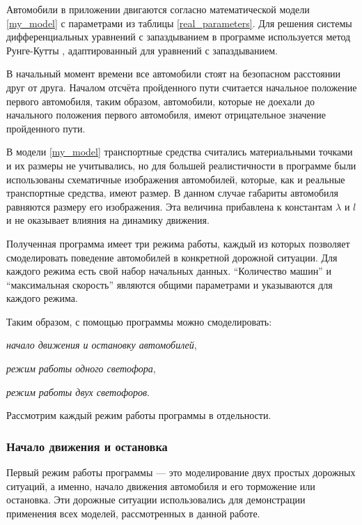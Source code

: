 \documentclass[12pt, a4paper]{extarticle}
\renewenvironment{itemize}[1][{---\hfil}]{\begin{list}{#1}{\topsep=0pt\parsep=0pt plus 1pt\itemsep=\parsep\leftmargin=0pt \itemindent=\parindent}\addtolength{\itemindent}{\labelwidth}}{\end{list}}
\numberwithin{equation}{section}
\numberwithin{figure}{section}
\begin{document}
Автомобили в приложении двигаются согласно математической модели \eqref{my_model} с параметрами из таблицы \ref{real_parameters}. Для решения системы дифференциальных уравнений с запаздыванием в программе используется метод Рунге-Кутты \cite{Runge_Kutta}, адаптированный для уравнений с запаздыванием.

В начальный момент времени все автомобили стоят на безопасном расстоянии друг от друга. Началом отсчёта пройденного пути считается начальное положение первого автомобиля, таким образом, автомобили, которые не доехали до начального положения первого автомобиля, имеют отрицательное значение пройденного пути.

В модели \eqref{my_model} транспортные средства считались материальными точками и их размеры не учитывались, но для большей реалистичности в программе были использованы схематичные изображения автомобилей, которые, как и реальные транспортные средства, имеют размер. В данном случае габариты автомобиля равняются размеру его изображения. Эта величина прибавлена к константам $\lambda$ и $l$ и не оказывает влияния на динамику движения.

Полученная программа имеет три режима работы, каждый из которых позволяет смоделировать поведение автомобилей в конкретной дорожной ситуации. Для каждого режима есть свой набор начальных данных. ``Количество машин'' и ``максимальная скорость'' являются общими параметрами и указываются для каждого режима.

\noindent Таким образом, с помощью программы можно смоделировать:

\begin{itemize} 
	\item \textit{начало движения и остановку автомобилей},
	\item \textit{режим работы одного светофора},
	\item \textit{режим работы двух светофоров}.
\end{itemize}

\noindent Рассмотрим каждый режим работы программы в отдельности.

\subsubsection{Начало движения и остановка}

Первый режим работы программы --- это моделирование двух простых дорожных ситуаций, а именно, начало движения автомобиля и его торможение или остановка. Эти дорожные ситуации использовались для демонстрации применения всех моделей, рассмотренных в данной работе.
\end{document}
